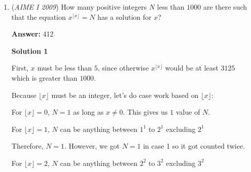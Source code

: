 \begin{enumerate}
Note that we are given that $\overline{MK} = \overline{KP}$, that $\overline{AK} = \overline{CK}.$ Note then that $\angle MKA = \angle CKB$ by vertical angles. From this, we have $\triangle MKA \cong PKC.$ This means that $\overline{CP}$ is 180. Applying angle bisector theorem on $\triangle ACB$ gives $\frac{\overline{AL}}{\overline{LB}} = \frac{450}{300} = \frac{3}{2}.$ Applying it on $\triangle KCB$ yields
 \[\frac{\overline{KP}}{\overline{PB}} = \frac{225}{300} = \frac{3}{4}\]Now we can proceed with area ratios. Suppose the area of $\triangle ACB = A.$ This means that 
 \[[\triangle AKL] = \left(\frac{225}{225+225}\right)\left(\frac{3}{5}\right)A = \frac{3}{10}A\]Continuing on $\triangle LPB$ we have 
 \[[\triangle LPB] = \left(\frac{2}{2+3}\right)\left(\frac{1}{2}\right)\left(\frac{4}{4+3}\right) = \frac{4}{35}A\]Since $\overline{AK}=\overline{KC}$ $[\triangle KPL] = [\triangle AKB]-[\triangle AKL] - [\triangle LPB] = \frac{1}{2}A - \frac{3}{10}A - \frac{4}{35}A = \frac{3}{35}A.$Area ratios on $\triangle KCP$ yield $[\triangle KCP] = \left(\frac{1}{2}\right)\left(\frac{3}{3+4}\right) = \frac{3}{14}.$ Now, suppose $\overline{LP} = x.$ We have that the ratio of areas of $\triangle LKP$ and $\triangle PKC$ is $\frac{x}{180}$and is also $\frac{\frac{3}{35}}{\frac{3}{14}}$ and equating these gives 
 \[x = \boxed{72}\]



	\item (\textit{AIME I 2009}) How many positive integers $N$ less than $1000$ are there such that the equation $x^{\lfloor x\rfloor} = N$ has a solution for $x$?


 
 \textbf{Answer: }412



\textbf{Solution 1}

First, $x$ must be less than $5$, since otherwise $x^{\lfloor x\rfloor}$ would be at least $3125$ which is greater than $1000$. 

 Because ${\lfloor x\rfloor}$ must be an integer, let’s do case work based on ${\lfloor x\rfloor}$:

 For ${\lfloor x\rfloor}=0$, $N=1$ as long as $x \neq 0$. This gives us $1$ value of $N$.

 For ${\lfloor x\rfloor}=1$, $N$ can be anything between $1^1$ to $2^1$ excluding $2^1$

 Therefore, $N=1$. However, we got $N=1$ in case 1 so it got counted twice.

 For ${\lfloor x\rfloor}=2$, $N$ can be anything between $2^2$ to $3^2$ excluding $3^2$


\end{enumerate}
